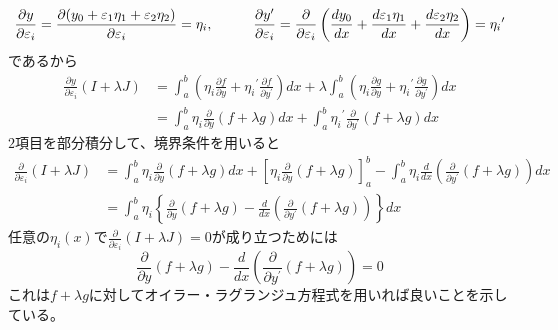 \documentclass{jsarticle}
\begin{document}
 \[\frac{\partial y}{\partial\varepsilon_{i}}=\frac{\partial(y_{0}+\varepsilon_{1}\eta_{1}+\varepsilon_{2}\eta_{2})}{\partial\varepsilon_{i}}=\eta_{i},\hspace{10mm}\frac{\partial y^{\prime}}{\partial\varepsilon_{i}}=\frac{\partial}{\partial\varepsilon_{i}}\left(\frac{dy_{0}}{dx}+\frac{d\varepsilon_{1}\eta_{1}}{dx}+\frac{d\varepsilon_{2}\eta_{2}}{dx}\right)={\eta_{i}}^{\prime}\]
 であるから
 \begin{align*}
 \frac{\partial y}{\partial\varepsilon_{i}}(I+\lambda J)&=\int_{a}^{b}\left(\eta_{i}\frac{\partial f}{\partial y}+{\eta_{i}}^{\prime}\frac{\partial f}{\partial y^{\prime}}\right)dx+\lambda\int_{a}^{b}\left(\eta_{i}\frac{\partial g}{\partial y}+{\eta_{i}}^{\prime}\frac{\partial g}{\partial y^{\prime}}\right)dx\\
&=\int_{a}^{b}\eta_{i}\frac{\partial}{\partial y}(f+\lambda g)dx+\int_{a}^{b}{\eta_{i}}^{\prime}\frac{\partial}{\partial y^{\prime}}(f+\lambda g)dx
\end{align*}
\(2\)項目を部分積分して、境界条件を用いると
\begin{align*}
\frac{\partial}{\partial\varepsilon_{i}}(I+\lambda J)&=\int_{a}^{b}\eta_{i}\frac{\partial}{\partial y}(f+\lambda g)dx+\left[\eta_{i}\frac{\partial}{\partial y}(f+\lambda g)\right]_{a}^{b}-\int_{a}^{b}\eta_{i}\frac{d}{dx}\left(\frac{\partial}{\partial y^{\prime}}(f+\lambda g)\right)dx\\
&=\int_{a}^{b}\eta_{i}\left\{\frac{\partial}{\partial y}(f+\lambda g)-\frac{d}{dx}\left(\frac{\partial}{\partial y^{\prime}}(f+\lambda g)\right)\right\}dx
\end{align*}
任意の\(\eta_{i}(x)\)で\(\frac{\partial}{\partial\varepsilon_{i}}(I+\lambda J)=0\)が成り立つためには
\[\frac{\partial}{\partial y}(f+\lambda g)-\frac{d}{dx}\left(\frac{\partial}{\partial y^{\prime}}(f+\lambda g)\right)=0\]
これは\(f+\lambda g\)に対してオイラー・ラグランジュ方程式を用いれば良いことを示している。\\
\\
\end{document}
